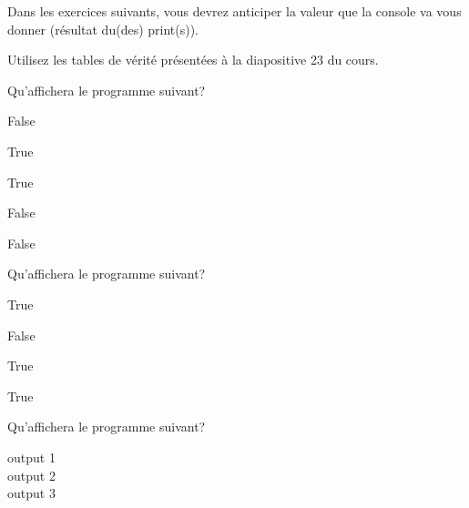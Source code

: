 Dans les exercices suivants, vous devrez anticiper la valeur que la console va vous donner (résultat du(des) print(s)). \\

\begin{conseil}
	Utilisez les tables de vérité présentées à la diapositive 23 du cours.
\end{conseil}


\begin{Exercice}[5 minutes] Qu'affichera le programme suivant?
    
    

    \begin{solution}
        False 
        
        True 
        
        True 
        
        False 
        
        False \\
    \end{solution}
\end{Exercice}
    
\begin{Exercice}[5 minutes] Qu'affichera le programme suivant?
    
    

    \begin{solution}
        True 
        
        False 
        
        True 
        
        True \\
    \end{solution}
    
\end{Exercice}
    
\begin{Exercice}[5 minutes] Qu'affichera le programme suivant?
    
    

    \begin{solution}
        output 1\\
        output 2\\
        output 3
    \end{solution}
    
\end{Exercice}

\newpage
